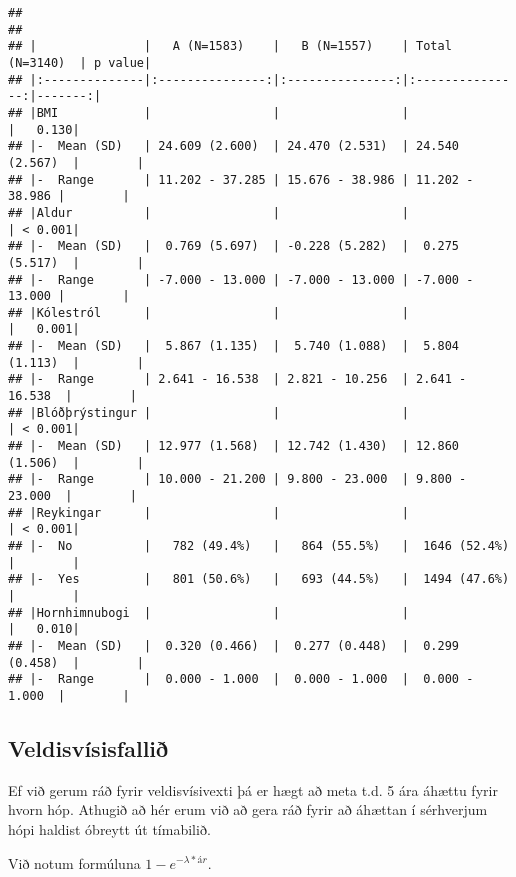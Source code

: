 \documentclass[
]{book}
\begin{document}
\begin{verbatim}
## 
## 
## |               |   A (N=1583)    |   B (N=1557)    | Total (N=3140)  | p value|
## |:--------------|:---------------:|:---------------:|:---------------:|-------:|
## |BMI            |                 |                 |                 |   0.130|
## |-  Mean (SD)   | 24.609 (2.600)  | 24.470 (2.531)  | 24.540 (2.567)  |        |
## |-  Range       | 11.202 - 37.285 | 15.676 - 38.986 | 11.202 - 38.986 |        |
## |Aldur          |                 |                 |                 | < 0.001|
## |-  Mean (SD)   |  0.769 (5.697)  | -0.228 (5.282)  |  0.275 (5.517)  |        |
## |-  Range       | -7.000 - 13.000 | -7.000 - 13.000 | -7.000 - 13.000 |        |
## |Kólestról      |                 |                 |                 |   0.001|
## |-  Mean (SD)   |  5.867 (1.135)  |  5.740 (1.088)  |  5.804 (1.113)  |        |
## |-  Range       | 2.641 - 16.538  | 2.821 - 10.256  | 2.641 - 16.538  |        |
## |Blóðþrýstingur |                 |                 |                 | < 0.001|
## |-  Mean (SD)   | 12.977 (1.568)  | 12.742 (1.430)  | 12.860 (1.506)  |        |
## |-  Range       | 10.000 - 21.200 | 9.800 - 23.000  | 9.800 - 23.000  |        |
## |Reykingar      |                 |                 |                 | < 0.001|
## |-  No          |   782 (49.4%)   |   864 (55.5%)   |  1646 (52.4%)   |        |
## |-  Yes         |   801 (50.6%)   |   693 (44.5%)   |  1494 (47.6%)   |        |
## |Hornhimnubogi  |                 |                 |                 |   0.010|
## |-  Mean (SD)   |  0.320 (0.466)  |  0.277 (0.448)  |  0.299 (0.458)  |        |
## |-  Range       |  0.000 - 1.000  |  0.000 - 1.000  |  0.000 - 1.000  |        |
\end{verbatim}

\hypertarget{veldisvuxedsisfalliuxf0}{%
\subsection{Veldisvísisfallið}\label{veldisvuxedsisfalliuxf0}}

Ef við gerum ráð fyrir veldisvísivexti þá er hægt að meta t.d. 5 ára áhættu fyrir hvorn hóp. Athugið að hér erum við að gera ráð fyrir að áhættan í sérhverjum hópi haldist óbreytt út tímabilið.

Við notum formúluna \(1-e^{-\lambda*ár}\).
\end{document}
